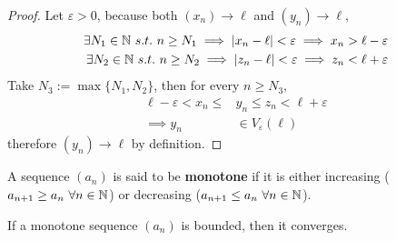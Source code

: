 \documentclass[11pt]{article}
\begin{document}
	\begin{proof}
%		
	Let $\varepsilon > 0$, because both $(x_n) \to \ell$ and $(y_n) \to \ell$,
	\begin{align}
		\exists N_1 \in \mathbb{N} \ s.t.\ n \geq N_1 \implies |x_n - \ell| < \varepsilon \implies x_n > \ell - \varepsilon \\
		\exists N_2 \in \mathbb{N} \ s.t.\ n \geq N_2 \implies |z_n - \ell| < \varepsilon \implies z_n < \ell +  \varepsilon
	\end{align}
	Take $N_3 := \max\{N_1, N_2\}$, then for every $n \geq N_3$,
	\begin{align}
		\ell - \varepsilon < x_n \leq &y_n \leq z_n < \ell + \varepsilon \\
		\implies y_n &\in V_\varepsilon(\ell)
	\end{align}
	therefore $(y_n) \to \ell$ by definition.
	\end{proof}
	
	\begin{definition}
		A sequence $(a_n)$ is said to be \textbf{monotone} if it is either increasing ($a_{n+1} \geq a_n\ \forall n \in \mathbb{N}$) or decreasing ($a_{n+1} \leq a_n\ \forall n \in \mathbb{N}$).
	\end{definition}
	
	\begin{theorem}
		If a monotone sequence $(a_n)$ is bounded, then it converges.
	\end{theorem}
	
\end{document}
